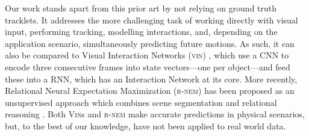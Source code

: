 Our work stands apart from this prior art by not relying on ground truth tracklets. It addresses the more challenging task of working directly with visual input, performing tracking, modelling interactions, and, depending on the application scenario, simultaneously predicting future motions. As such, it can also be compared to Visual Interaction Networks (\textsc{vin}) \citep{Watters2017}, which use a \gls{CNN} to encode three consecutive frames into state vectors---one per object---and feed these into a \gls{RNN}, which has an Interaction Network \citep{Battaglia2016} at its core. 
More recently, Relational Neural Expectation Maximization (\textsc{r-nem}) has been proposed as an unsupervised approach which combines scene segmentation and relational reasoning \citep{Steenkiste2018}.
Both \textsc{Vin}s and \textsc{r-nem} make accurate predictions in physical scenarios, but, to the best of our knowledge, have not been applied to real world data.
